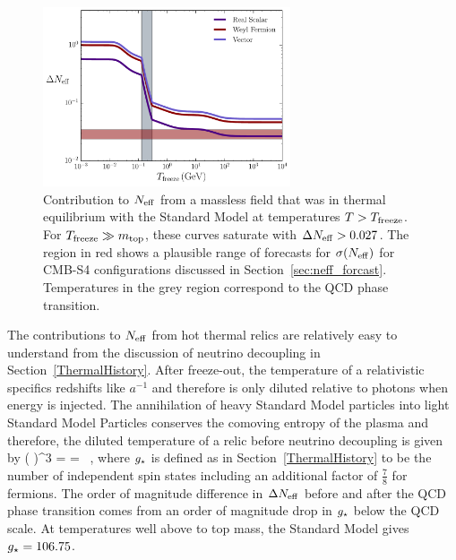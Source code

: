 \begin{figure}[t!]
\begin{center}
\includegraphics[width=0.65\textwidth]{Neutrinos/Neff.pdf}
\caption{Contribution to $N_{\rm eff}$ from a massless field that was in thermal equilibrium with the Standard Model at temperatures $T> T_{\rm freeze}$.  For $T_{\rm freeze} \gg m_{\rm top}$, these curves saturate with $\Delta N_{\rm eff} > 0.027$.   The region in red shows a plausible range of forecasts for $\sigma(N_{\rm eff})$ for CMB-S4 configurations discussed in Section~\ref{sec:neff_forcast}. Temperatures in the grey region correspond to the QCD phase transition.}
\label{fig:Neff_thermal}
\end{center}
\end{figure} 

The contributions to $N_{\rm eff}$ from hot thermal relics are relatively easy to understand from the discussion of neutrino decoupling in Section~\ref{ThermalHistory}.  After freeze-out, the temperature of a relativistic specifics redshifts like $a^{-1}$ and therefore is only diluted relative to photons when energy is injected.  The annihilation of heavy Standard Model particles into light Standard Model Particles conserves the comoving entropy of the plasma and therefore, the diluted temperature of a relic before neutrino decoupling is given by
\beq
\left(  \right)^3 = =  \, ,
\eeq
where $g_{\star}$ is defined as in Section~\ref{ThermalHistory} to be the number of independent spin states including an additional factor of $\frac{7}{8}$ for fermions.  The order of magnitude difference in $\Delta N_{\rm eff}$ before and after the QCD phase transition comes from an order of magnitude drop in $g_{\star}$ below the QCD scale.  At temperatures well above to top mass, the Standard Model gives $g_{\star} = 106.75$.  

